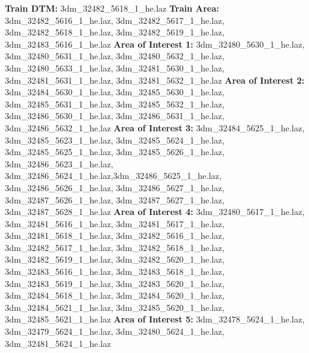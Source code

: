 \documentclass[
  12pt,
]{article}
\begin{document}
\textbf{Train DTM:} 3dm\_32482\_5618\_1\_he.laz
\newline
\textbf{Train Area:} 3dm\_32482\_5616\_1\_he.laz, 3dm\_32482\_5617\_1\_he.laz,
\newline
3dm\_32482\_5618\_1\_he.laz, 3dm\_32482\_5619\_1\_he.laz, 3dm\_32483\_5616\_1\_he.laz
\newline
\textbf{Area of Interest 1:} 3dm\_32480\_5630\_1\_he.laz, 3dm\_32480\_5631\_1\_he.laz,
\newline
3dm\_32480\_5632\_1\_he.laz, 3dm\_32480\_5633\_1\_he.laz, 3dm\_32481\_5630\_1\_he.laz,
\newline
3dm\_32481\_5631\_1\_he.laz, 3dm\_32481\_5632\_1\_he.laz
\newline
\textbf{Area of Interest 2:} 3dm\_32484\_5630\_1\_he.laz, 3dm\_32485\_5630\_1\_he.laz,
\newline
3dm\_32485\_5631\_1\_he.laz, 3dm\_32485\_5632\_1\_he.laz, 3dm\_32486\_5630\_1\_he.laz,
\newline
3dm\_32486\_5631\_1\_he.laz, 3dm\_32486\_5632\_1\_he.laz
\newline
\textbf{Area of Interest 3:} 3dm\_32484\_5625\_1\_he.laz, 3dm\_32485\_5623\_1\_he.laz,
\newline
3dm\_32485\_5624\_1\_he.laz, 3dm\_32485\_5625\_1\_he.laz, 3dm\_32485\_5626\_1\_he.laz,
\newline
3dm\_32486\_5623\_1\_he.laz, 3dm\_32486\_5624\_1\_he.laz,3dm\_32486\_5625\_1\_he.laz,
\newline
3dm\_32486\_5626\_1\_he.laz, 3dm\_32486\_5627\_1\_he.laz, 3dm\_32487\_5626\_1\_he.laz,
\newline
3dm\_32487\_5627\_1\_he.laz, 3dm\_32487\_5628\_1\_he.laz
\newline
\textbf{Area of Interest 4:} 3dm\_32480\_5617\_1\_he.laz, 3dm\_32481\_5616\_1\_he.laz,
\newline
3dm\_32481\_5617\_1\_he.laz, 3dm\_32481\_5618\_1\_he.laz, 3dm\_32482\_5616\_1\_he.laz,
\newline
3dm\_32482\_5617\_1\_he.laz, 3dm\_32482\_5618\_1\_he.laz, 3dm\_32482\_5619\_1\_he.laz,
\newline
3dm\_32482\_5620\_1\_he.laz, 3dm\_32483\_5616\_1\_he.laz, 3dm\_32483\_5618\_1\_he.laz,
\newline
3dm\_32483\_5619\_1\_he.laz, 3dm\_32483\_5620\_1\_he.laz, 3dm\_32484\_5618\_1\_he.laz,
\newline
3dm\_32484\_5620\_1\_he.laz, 3dm\_32484\_5621\_1\_he.laz, 3dm\_32485\_5620\_1\_he.laz,
\newline
3dm\_32485\_5621\_1\_he.laz
\newline
\textbf{Area of Interest 5:} 3dm\_32478\_5624\_1\_he.laz, 3dm\_32479\_5624\_1\_he.laz,
\newline
3dm\_32480\_5624\_1\_he.laz, 3dm\_32481\_5624\_1\_he.laz
\end{document}
